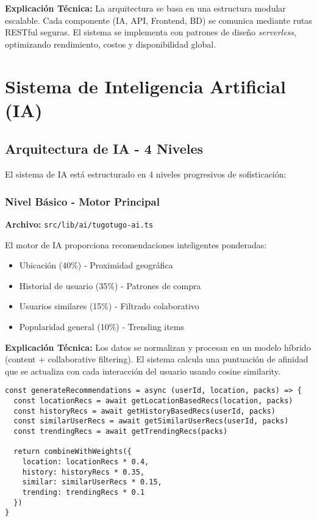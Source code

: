 \documentclass[a4paper,12pt]{article}
\begin{document}
\textbf{Explicación Técnica:}  
La arquitectura se basa en una estructura modular escalable. Cada componente (IA, API, Frontend, BD) se comunica mediante rutas RESTful seguras. El sistema se implementa con patrones de diseño \textit{serverless}, optimizando rendimiento, costos y disponibilidad global.

\section{Sistema de Inteligencia Artificial (IA)}

\subsection{Arquitectura de IA - 4 Niveles}
El sistema de IA está estructurado en 4 niveles progresivos de sofisticación:

\subsubsection{Nivel Básico - Motor Principal}
\textbf{Archivo:} \texttt{src/lib/ai/tugotugo-ai.ts}

El motor de IA proporciona recomendaciones inteligentes ponderadas:
\begin{itemize}
  \item Ubicación (40\%) - Proximidad geográfica
  \item Historial de usuario (35\%) - Patrones de compra
  \item Usuarios similares (15\%) - Filtrado colaborativo
  \item Popularidad general (10\%) - Trending items
\end{itemize}

\textbf{Explicación Técnica:}  
Los datos se normalizan y procesan en un modelo híbrido (content + collaborative filtering). El sistema calcula una puntuación de afinidad que se actualiza con cada interacción del usuario usando cosine similarity.

\begin{lstlisting}[caption=Algoritmo de Recomendación Principal]
const generateRecommendations = async (userId, location, packs) => {
  const locationRecs = await getLocationBasedRecs(location, packs)
  const historyRecs = await getHistoryBasedRecs(userId, packs)
  const similarUserRecs = await getSimilarUserRecs(userId, packs)
  const trendingRecs = await getTrendingRecs(packs)
  
  return combineWithWeights({
    location: locationRecs * 0.4,
    history: historyRecs * 0.35,
    similar: similarUserRecs * 0.15,
    trending: trendingRecs * 0.1
  })
}
\end{lstlisting}
\end{document}

